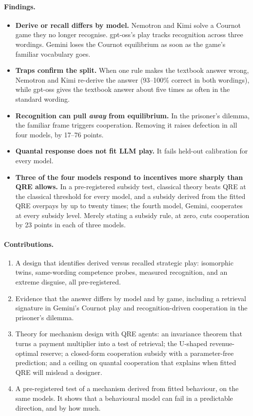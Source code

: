 \documentclass[10pt]{article}
\theoremstyle{definition}
\theoremstyle{remark}
\begin{document}
\paragraph{Findings.}
\begin{itemize}
\item \textbf{Derive or recall differs by model.} Nemotron and Kimi solve a Cournot game they no
  longer recognise. gpt-oss's play tracks recognition across three wordings. Gemini loses the
  Cournot equilibrium as soon as the game's familiar vocabulary goes.
\item \textbf{Traps confirm the split.} When one rule makes the textbook answer wrong, Nemotron
  and Kimi re-derive the answer (93--100\% correct in both wordings), while gpt-oss gives the
  textbook answer about five times as often in the standard wording.
\item \textbf{Recognition can pull \emph{away} from equilibrium.} In the prisoner's dilemma, the
  familiar frame triggers cooperation. Removing it raises defection in all four models, by
  17--76 points.
\item \textbf{Quantal response does not fit LLM play.} It fails held-out calibration for every
  model.
\item \textbf{Three of the four models respond to incentives more sharply than QRE allows.} In a
  pre-registered subsidy test, classical theory beats QRE at the classical threshold for every
  model, and a subsidy derived from the fitted QRE overpays by up to twenty times; the fourth
  model, Gemini, cooperates at every subsidy level. Merely stating a subsidy rule, at zero, cuts cooperation by
  23 points in each of three models.
\end{itemize}

\paragraph{Contributions.}
\begin{enumerate}
\item A design that identifies derived versus recalled strategic play: isomorphic twins,
  same-wording competence probes, measured recognition, and an extreme disguise, all
  pre-registered.
\item Evidence that the answer differs by model and by game, including a retrieval signature in
  Gemini's Cournot play and recognition-driven cooperation in the prisoner's dilemma.
\item Theory for mechanism design with QRE agents: an invariance theorem that turns a payment
  multiplier into a test of retrieval; the U-shaped revenue-optimal reserve; a closed-form
  cooperation subsidy with a parameter-free prediction; and a ceiling on quantal cooperation
  that explains when fitted QRE will mislead a designer.
\item A pre-registered test of a mechanism derived from fitted behaviour, on the same models.
  It shows that a behavioural model can fail in a predictable direction, and by how much.
\end{enumerate}
\end{document}
